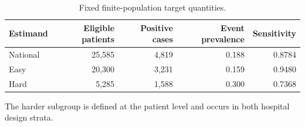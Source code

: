 \begin{table}[h!]
\centering
\small
\caption{Fixed finite-population target quantities.}
\label{tab:nav-population-truths}
\begin{tabular}{lrrrr}
\toprule
Estimand & Eligible patients & Positive cases & Event prevalence & Sensitivity \\
\midrule
National & 25,585 & 4,819 & 0.188 & 0.8784 \\
Easy & 20,300 & 3,231 & 0.159 & 0.9480 \\
Hard &  5,285 & 1,588 & 0.300 & 0.7368 \\
\bottomrule
\end{tabular}
\par\vspace{2pt}
\begin{minipage}{0.97\linewidth}\footnotesize The harder subgroup is defined at the patient level and occurs in both hospital design strata.\end{minipage}
\end{table}


